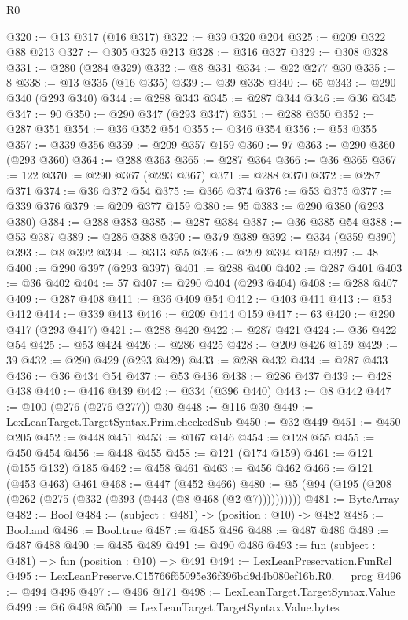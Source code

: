 \begin{lexlean}{R0}
\begin{coremodule}
@320 := @13 @317 (@16 @317)
@322 := @39 @320 @204
@325 := @209 @322 @88 @213
@327 := @305 @325 @213
@328 := @316 @327
@329 := @308 @328
@331 := @280 (@284 @329)
@332 := @8 @331
@334 := @22 @277 @30
@335 := 8
@338 := @13 @335 (@16 @335)
@339 := @39 @338
@340 := 65
@343 := @290 @340 (@293 @340)
@344 := @288 @343
@345 := @287 @344
@346 := @36 @345
@347 := 90
@350 := @290 @347 (@293 @347)
@351 := @288 @350
@352 := @287 @351
@354 := @36 @352 @54
@355 := @346 @354
@356 := @53 @355
@357 := @339 @356
@359 := @209 @357 @159
@360 := 97
@363 := @290 @360 (@293 @360)
@364 := @288 @363
@365 := @287 @364
@366 := @36 @365
@367 := 122
@370 := @290 @367 (@293 @367)
@371 := @288 @370
@372 := @287 @371
@374 := @36 @372 @54
@375 := @366 @374
@376 := @53 @375
@377 := @339 @376
@379 := @209 @377 @159
@380 := 95
@383 := @290 @380 (@293 @380)
@384 := @288 @383
@385 := @287 @384
@387 := @36 @385 @54
@388 := @53 @387
@389 := @286 @388
@390 := @379 @389
@392 := @334 (@359 @390)
@393 := @8 @392
@394 := @313 @55
@396 := @209 @394 @159
@397 := 48
@400 := @290 @397 (@293 @397)
@401 := @288 @400
@402 := @287 @401
@403 := @36 @402
@404 := 57
@407 := @290 @404 (@293 @404)
@408 := @288 @407
@409 := @287 @408
@411 := @36 @409 @54
@412 := @403 @411
@413 := @53 @412
@414 := @339 @413
@416 := @209 @414 @159
@417 := 63
@420 := @290 @417 (@293 @417)
@421 := @288 @420
@422 := @287 @421
@424 := @36 @422 @54
@425 := @53 @424
@426 := @286 @425
@428 := @209 @426 @159
@429 := 39
@432 := @290 @429 (@293 @429)
@433 := @288 @432
@434 := @287 @433
@436 := @36 @434 @54
@437 := @53 @436
@438 := @286 @437
@439 := @428 @438
@440 := @416 @439
@442 := @334 (@396 @440)
@443 := @8 @442
@447 := @100 (@276 (@276 @277)) @30
@448 := @116 @30
@449 := LexLeanTarget.TargetSyntax.Prim.checkedSub
@450 := @32 @449
@451 := @450 @205
@452 := @448 @451
@453 := @167 @146
@454 := @128 @55
@455 := @450 @454
@456 := @448 @455
@458 := @121 (@174 @159)
@461 := @121 (@155 @132) @185
@462 := @458 @461
@463 := @456 @462
@466 := @121 (@453 @463) @461
@468 := @447 (@452 @466)
@480 := @5 (@94 (@195 (@208 (@262 (@275 (@332 (@393 (@443 (@8 @468 (@2 @7))))))))))
@481 := ByteArray
@482 := Bool
@484 := (subject : @481) -> (position : @10) -> @482
@485 := Bool.and
@486 := Bool.true
@487 := @485 @486
@488 := @487 @486
@489 := @487 @488
@490 := @485 @489
@491 := @490 @486
@493 := fun (subject : @481) => fun (position : @10) => @491
@494 := LexLeanPreservation.FunRel
@495 := LexLeanPreserve.C15766f65095e36f396bd9d4b080ef16b.R0.__prog
@496 := @494 @495
@497 := @496 @171
@498 := LexLeanTarget.TargetSyntax.Value
@499 := @6 @498
@500 := LexLeanTarget.TargetSyntax.Value.bytes

\end{coremodule}
\end{lexlean}
